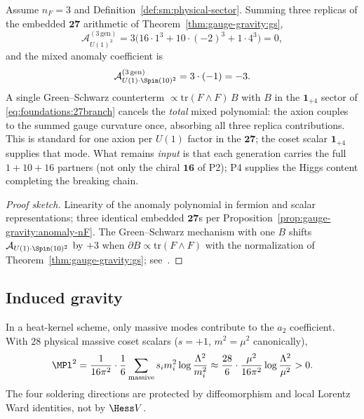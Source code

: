 \begin{proposition}[Mixed Green--Schwarz with $n_F=3$ replicas]
\label{prop:gauge-gravity:gs-nF}
Assume $n_F=3$ and Definition~\ref{def:sm:physical-sector}. Summing three replicas of the
embedded $\mathbf{27}$ arithmetic of Theorem~\ref{thm:gauge-gravity:gs},
\begin{equation}\label{eq:gauge-gravity:gs-nF-cubic}
  \mathcal{A}_{U(1)^3}^{(3\,\mathrm{gen})}
  = 3\bigl(16\cdot1^3+10\cdot(-2)^3+1\cdot4^3\bigr)=0,
\end{equation}
and the mixed anomaly coefficient is
\begin{equation}\label{eq:gauge-gravity:gs-nF-mixed}
  \mathcal{A}_{U(1)\cdot\Spin(10)^2}^{(3\,\mathrm{gen})}
  = 3\cdot(-1)=-3.
\end{equation}
A single Green--Schwarz counterterm $\propto\mathrm{tr}(F\wedge F)\,B$ with
$B$ in the $\mathbf{1}_{+4}$ sector of \eqref{eq:foundations:27branch} cancels
the \emph{total} mixed polynomial: the axion couples to the summed gauge
curvature once, absorbing all three replica contributions. This is standard
for one axion per $U(1)$ factor in the $\mathbf{27}$; the coset scalar
$\mathbf{1}_{+4}$ supplies that mode. What remains \emph{input} is that each
generation carries the full $1+10+16$ partners (not only the chiral
$\mathbf{16}$ of P2); P4 supplies the Higgs content completing the breaking
chain.
\end{proposition}

\begin{proof}[Proof sketch]
Linearity of the anomaly polynomial in fermion and scalar representations;
three identical embedded $\mathbf{27}$s per
Proposition~\ref{prop:gauge-gravity:anomaly-nF}. The Green--Schwarz mechanism
with one $B$ shifts $\mathcal{A}_{U(1)\cdot\Spin(10)^2}$ by $+3$ when
$\partial B\propto\mathrm{tr}(F\wedge F)$ with the normalization of
Theorem~\ref{thm:gauge-gravity:gs}; see~\cite{GreenSchwarz1984}.
\end{proof}

\subsection{Induced gravity}
\label{sec:gauge-gravity:gravity}

\begin{theorem}\label{thm:gauge-gravity:planck}
In a heat-kernel scheme, only massive modes contribute to the $a_2$ coefficient.
With $28$ physical massive coset scalars ($s=+1$, $m^2=\mu^2$ canonically),
\begin{equation}\label{eq:gauge-gravity:planck}
  \MPl^2
  =\frac{1}{16\pi^2}\cdot\frac{1}{6}\sum_{\mathrm{massive}} s_i m_i^2
  \log\frac{\Lambda^2}{m_i^2}
  \approx\frac{28}{6}\cdot\frac{\mu^2}{16\pi^2}
  \log\frac{\Lambda^2}{\mu^2}>0.
\end{equation}
The four soldering directions are protected by diffeomorphism and local Lorentz
Ward identities, not by $\Hess V$.
\end{theorem}

